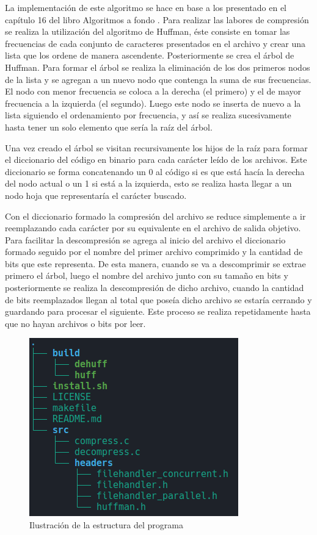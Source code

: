 \documentclass{report}
\begin{document}
La implementación de este algoritmo se hace en base a los presentado en el capítulo 16 del libro Algoritmos a fondo \cite{book_huffman}. Para realizar las labores de compresión se realiza la utilización del algoritmo de Huffman, éste consiste en tomar las frecuencias de cada conjunto de caracteres presentados en el archivo y crear una lista que los ordene de manera ascendente. Posteriormente se crea el árbol de Huffman. Para formar el árbol se realiza la eliminación de los dos primeros nodos de la lista y se agregan a un nuevo nodo que contenga la suma de sus frecuencias. El nodo con menor frecuencia se coloca a la derecha (el primero) y el de mayor frecuencia a la izquierda (el segundo). Luego este nodo se inserta de nuevo a la lista siguiendo el ordenamiento por frecuencia, y así se realiza sucesivamente hasta tener un solo elemento que sería la raíz del árbol.

Una vez creado el árbol se visitan recursivamente los hijos de la raíz para formar el diccionario del código en binario para cada carácter leído de los archivos. Este diccionario se forma concatenando un 0 al código si es que está hacía la derecha del nodo actual o un 1 si está a la izquierda, esto se realiza hasta llegar a un nodo hoja que representaría el carácter buscado.

Con el diccionario formado la compresión del archivo se reduce simplemente a ir reemplazando cada carácter por su equivalente en el archivo de salida objetivo. Para facilitar la descompresión se agrega al inicio del archivo el diccionario formado seguido por el nombre del primer archivo comprimido y la cantidad de bits que este representa. De esta manera, cuando se va a descomprimir se extrae primero el árbol, luego el nombre del archivo junto con su tamaño en bits y posteriormente se realiza la descompresión de dicho archivo, cuando la cantidad de bits reemplazados llegan al total que poseía dicho archivo se estaría cerrando y guardando para procesar el siguiente. Este proceso se realiza repetidamente hasta que no hayan archivos o bits por leer.

\begin{figure}[h]
    \centering
    \includegraphics[width=0.8\linewidth]{figuras/estructura.png}
    \caption{Ilustración de la estructura del programa}
    \label{fig:estructura}
\end{figure}
\end{document}
